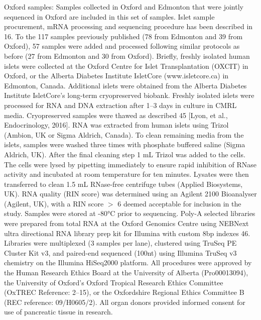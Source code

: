 Oxford samples: Samples collected in Oxford and Edmonton that were jointly sequenced in Oxford are included in this set of samples. Islet sample procurement, mRNA processing and sequencing procedure has been described in 16. To the 117 samples previously published (78 from Edmonton and 39 from Oxford), 57 samples were added and processed following similar protocols as before (27 from Edmonton and 30 from Oxford). Briefly, freshly isolated human islets were collected at the Oxford Centre for Islet Transplantation (OXCIT) in Oxford, or the Alberta Diabetes Institute IsletCore (www.isletcore.ca) in Edmonton, Canada. Additional islets were obtained from the Alberta Diabetes Institute IsletCore's long-term cryopreserved biobank. Freshly isolated islets were processed for RNA and DNA extraction after 1–3 days in culture in CMRL media. Cryopreserved samples were thawed as described 45 [Lyon, et al., Endocrinology, 2016]. RNA was extracted from human islets using Trizol (Ambion, UK or Sigma Aldrich, Canada). To clean remaining media from the islets, samples were washed three times with phosphate buffered saline (Sigma Aldrich, UK). After the final cleaning step 1 mL Trizol was added to the cells. The cells were lysed by pipetting immediately to ensure rapid inhibition of RNase activity and incubated at room temperature for ten minutes. Lysates were then transferred to clean 1.5 mL RNase-free centrifuge tubes (Applied Biosystems, UK). RNA quality (RIN score) was determined using an Agilent 2100 Bioanalyser (Agilent, UK), with a RIN score $>$ 6 deemed acceptable for inclusion in the study. Samples were stored at -80°C prior to sequencing. Poly-A selected libraries were prepared from total RNA at the Oxford Genomics Centre using NEBNext ultra directional RNA library prep kit for Illumina with custom 8bp indexes 46. Libraries were multiplexed (3 samples per lane), clustered using TruSeq PE Cluster Kit v3, and paired-end sequenced (100nt) using Illumina TruSeq v3 chemistry on the Illumina HiSeq2000 platform. All procedures were approved by the Human Research Ethics Board at the University of Alberta (Pro00013094), the University of Oxford's Oxford Tropical Research Ethics Committee (OxTREC Reference: 2–15), or the Oxfordshire Regional Ethics Committee B (REC reference: 09/H0605/2). All organ donors provided informed consent for use of pancreatic tissue in research. \\

